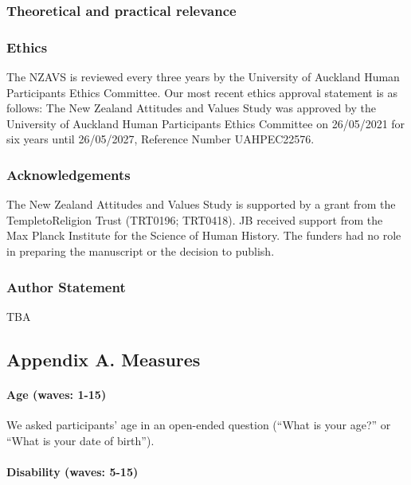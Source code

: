 \documentclass[
  singlecolumn]{article}
\let\oldparagraph\paragraph
\renewcommand{\paragraph}[1]{\oldparagraph{#1}\mbox{}}
\begin{document}
\subsubsection{Theoretical and practical
relevance}\label{theoretical-and-practical-relevance}

\newpage{}

\subsubsection{Ethics}\label{ethics}

The NZAVS is reviewed every three years by the University of Auckland
Human Participants Ethics Committee. Our most recent ethics approval
statement is as follows: The New Zealand Attitudes and Values Study was
approved by the University of Auckland Human Participants Ethics
Committee on 26/05/2021 for six years until 26/05/2027, Reference Number
UAHPEC22576.

\subsubsection{Acknowledgements}\label{acknowledgements}

The New Zealand Attitudes and Values Study is supported by a grant from
the TempletoReligion Trust (TRT0196; TRT0418). JB received support from
the Max Planck Institute for the Science of Human History. The funders
had no role in preparing the manuscript or the decision to publish.

\subsubsection{Author Statement}\label{author-statement}

TBA

\newpage{}

\subsection{Appendix A. Measures}\label{appendix-a.-measures}

\paragraph{Age (waves: 1-15)}\label{age-waves-1-15}

We asked participants' age in an open-ended question (``What is your
age?'' or ``What is your date of birth'').

\paragraph{Disability (waves: 5-15)}\label{disability-waves-5-15}
\end{document}
